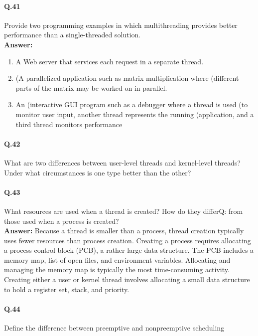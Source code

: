 \documentclass[a4paper,10pt]{article}
\begin{document}
\paragraph{Q.41}
Provide two programming examples in which multithreading provides
better performance than a single-threaded solution.
\\
\textbf{Answer:}
\begin{enumerate}
   \item A Web server that services each request in a separate
thread.
\item (A parallelized application such as matrix multiplication where (different
parts of the matrix may be worked on in parallel.
\item An (interactive GUI program such as a debugger where a thread is used (to
monitor user input, another thread represents the running (application, and a
third thread monitors performance
\end{enumerate}

\paragraph{Q.42}
What are two differences between user-level threads and kernel-level
threads? Under what circumstances is one type better than the other?

\paragraph{Q.43}
What resources are used when a thread is created? How do they differQ:
from those used when a process is created?\\
\textbf{Answer:} Because a thread is smaller than a process, thread creation
typically uses fewer resources than process creation. Creating a process
requires allocating a process control block (PCB), a rather large data
structure. The PCB includes a memory map, list of open files, and environment
variables. Allocating and managing the memory map is typically
the most time-consuming activity. Creating either a user or kernel thread
involves allocating a small data structure to hold a register set, stack, and
priority.

\paragraph{Q.44}
Define the difference between preemptive and nonpreemptive scheduling
\end{document}
